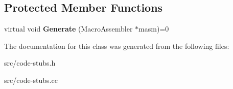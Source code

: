 \subsection*{Protected Member Functions}
\begin{DoxyCompactItemize}
\item 
\hypertarget{classv8_1_1internal_1_1_platform_code_stub_abf3ab13ab21a602c4126a8085f1122b0}{}virtual void {\bfseries Generate} (Macro\+Assembler $\ast$masm)=0\label{classv8_1_1internal_1_1_platform_code_stub_abf3ab13ab21a602c4126a8085f1122b0}

\end{DoxyCompactItemize}


The documentation for this class was generated from the following files\+:\begin{DoxyCompactItemize}
\item 
src/code-\/stubs.\+h\item 
src/code-\/stubs.\+cc\end{DoxyCompactItemize}
